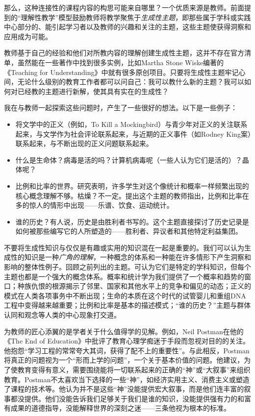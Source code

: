 那么，这种连接性的课程内容的构思可能来自哪里？一个优质来源是教师。前面提到的“理解性教学”模型鼓励教师将教学聚焦于\textit{生成性主题}，即那些属于学科或实践中心部分的、能引起学习者以及教师的兴趣和关注的主题，这些主题使获得洞察和应用成为可能。

教师基于自己的经验和他们对所教内容的理解创建生成性主题，这并不存在官方清单，虽然能在一些著作中找到很多实例，比如Martha Stone Wiske编著的《Teaching for Understanding》中就有很多原创项目。只要将生成性主题牢记心间，无论什么级别的教育工作者都可以问自己：我可以教什么新的主题？我可以如何对已经教的主题进行新解，使其具有实在的生成性？

我在与教师一起探索这些问题时，产生了一些很好的想法。以下是一些例子：
\begin{itemize}
    \item 将文学中的正义（例如，To Kill a Mockingbird）与青少年对正义的关注联系起来，与文学作为社会评论联系起来，与近期的正义事件（如Rodney King案）联系起来，与不断出现的正义问题联系起来。
    \item 什么是生命体？病毒是活的吗？计算机病毒呢（一些人认为它们是活的）？晶体呢？
    \item 比例和比率的世界。研究表明，许多学生对这个像统计和概率一样频繁出现的核心概念理解不够。枯燥？不一定。提出这个主题的教师指出，比例和比率在多的惊人的情形中出现——乐谱、饮食、运动统计。
    \item 谁的历史？有人说，历史是由胜利者书写的。这个主题直接探讨了历史记录是如何被那些编写它的人所塑造的——胜利者、异议者和其他特定利益集团。
\end{itemize}

不要将生成性知识与仅仅是有趣或实用的知识混在一起是重要的。我们可以认为生成性的知识是一种\textit{广角的理解}，一种概念的体系和一种能在许多情形下产生洞察和影响的整体性例子。回顾之前列出的主题。可认为它们是特定的学科知识，但每个主题也都是一个强大的概念体系。概率和统计学为我们提供了一个概率和趋势的窗口；种族仇恨的根源揭示了邻里、国家和其他水平上的竞争和偏见的动态；正义的模式在人类各项事务中不断出现；生命的本质在这个时代的试管婴儿和重组DNA工程中变得越来越重要；比例和比率是基本的描述模式；“谁的历史？”主题与群体认同和观念等人类的中心现象打交道。

为教师的匠心添翼的是学者关于什么值得学的见解。例如，Neil Postman在他的《The End of Education》中批评了教育心理学痴迷于手段而忽视对目的的关注。他抱怨“学习工程的常常夸大其词，获得了配不上的重要性”。与此相反，Postman将真正的问题视为一个“形而上学的问题”，一个关于基本价值的问题。他建议，为了使教育变得有意义，需要围绕能将一切联系起来的正确的“神”或“大叙事”来组织教育。Postman不太喜欢当下选择的一些“神”，如经济实用主义、消费主义或塑造了课程的技术等。他认为并不是这些“神”没能提供宏大叙事，而是他们连丰富的叙事都没提供。他们没能告诉我们足够关于我们是谁的知识，没能提供强有力的和富有成果的道德指导，没能解释世界的深刻之迷——三条他视为根本的标准。

